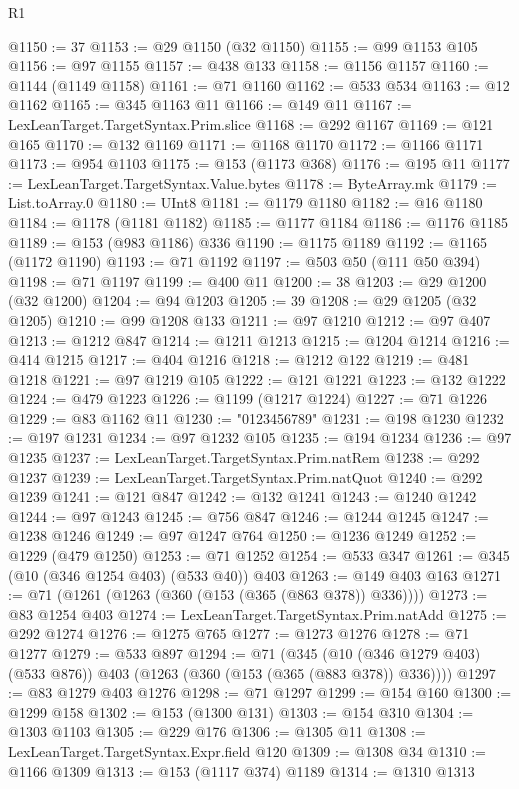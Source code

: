 \begin{lexlean}{R1}
\begin{coremodule}
{{{{{{{{{{{{{{{{{{{{{{{{{{{{{{{{{{{{{{{{{{{{{{{{{{{{{{{{{{{{{{{{{{{{{{{{{{{{{{{{{{{{{{{{{{{{{{{{{{{{{{{{{{{{{{{{{{{{{{{{{{{{{{{{{{{{{{{{{{{{{{{{{{{{{{{{{{{{{{{{{{{{{{{{{{{{{{{{{{{{{{{{{{@1150 := 37
@1153 := @29 @1150 (@32 @1150)
@1155 := @99 @1153 @105
@1156 := @97 @1155
@1157 := @438 @133
@1158 := @1156 @1157
@1160 := @1144 (@1149 @1158)
@1161 := @71 @1160
@1162 := @533 @534
@1163 := @12 @1162
@1165 := @345 @1163 @11
@1166 := @149 @11
@1167 := LexLeanTarget.TargetSyntax.Prim.slice
@1168 := @292 @1167
@1169 := @121 @165
@1170 := @132 @1169
@1171 := @1168 @1170
@1172 := @1166 @1171
@1173 := @954 @1103
@1175 := @153 (@1173 @368)
@1176 := @195 @11
@1177 := LexLeanTarget.TargetSyntax.Value.bytes
@1178 := ByteArray.mk
@1179 := List.toArray.{0}
@1180 := UInt8
@1181 := @1179 @1180
@1182 := @16 @1180
@1184 := @1178 (@1181 @1182)
@1185 := @1177 @1184
@1186 := @1176 @1185
@1189 := @153 (@983 @1186) @336
@1190 := @1175 @1189
@1192 := @1165 (@1172 @1190)
@1193 := @71 @1192
@1197 := @503 @50 (@111 @50 @394)
@1198 := @71 @1197
@1199 := @400 @11
@1200 := 38
@1203 := @29 @1200 (@32 @1200)
@1204 := @94 @1203
@1205 := 39
@1208 := @29 @1205 (@32 @1205)
@1210 := @99 @1208 @133
@1211 := @97 @1210
@1212 := @97 @407
@1213 := @1212 @847
@1214 := @1211 @1213
@1215 := @1204 @1214
@1216 := @414 @1215
@1217 := @404 @1216
@1218 := @1212 @122
@1219 := @481 @1218
@1221 := @97 @1219 @105
@1222 := @121 @1221
@1223 := @132 @1222
@1224 := @479 @1223
@1226 := @1199 (@1217 @1224)
@1227 := @71 @1226
@1229 := @83 @1162 @11
@1230 := "0123456789"
@1231 := @198 @1230
@1232 := @197 @1231
@1234 := @97 @1232 @105
@1235 := @194 @1234
@1236 := @97 @1235
@1237 := LexLeanTarget.TargetSyntax.Prim.natRem
@1238 := @292 @1237
@1239 := LexLeanTarget.TargetSyntax.Prim.natQuot
@1240 := @292 @1239
@1241 := @121 @847
@1242 := @132 @1241
@1243 := @1240 @1242
@1244 := @97 @1243
@1245 := @756 @847
@1246 := @1244 @1245
@1247 := @1238 @1246
@1249 := @97 @1247 @764
@1250 := @1236 @1249
@1252 := @1229 (@479 @1250)
@1253 := @71 @1252
@1254 := @533 @347
@1261 := @345 (@10 (@346 @1254 @403) (@533 @40)) @403
@1263 := @149 @403 @163
@1271 := @71 (@1261 (@1263 (@360 (@153 (@365 (@863 @378)) @336))))
@1273 := @83 @1254 @403
@1274 := LexLeanTarget.TargetSyntax.Prim.natAdd
@1275 := @292 @1274
@1276 := @1275 @765
@1277 := @1273 @1276
@1278 := @71 @1277
@1279 := @533 @897
@1294 := @71
    (@345 (@10 (@346 @1279 @403) (@533 @876)) @403 (@1263 (@360 (@153 (@365 (@883 @378)) @336))))
@1297 := @83 @1279 @403 @1276
@1298 := @71 @1297
@1299 := @154 @160
@1300 := @1299 @158
@1302 := @153 (@1300 @131)
@1303 := @154 @310
@1304 := @1303 @1103
@1305 := @229 @176
@1306 := @1305 @11
@1308 := LexLeanTarget.TargetSyntax.Expr.field @120
@1309 := @1308 @34
@1310 := @1166 @1309
@1313 := @153 (@1117 @374) @1189
@1314 := @1310 @1313
}}}}}}}}}}}}}}}}}}}}}}}}}}}}}}}}}}}}}}}}}}}}}}}}}}}}}}}}}}}}}}}}}}}}}}}}}}}}}}}}}}}}}}}}}}}}}}}}}}}}}}}}}}}}}}}}}}}}}}}}}}}}}}}}}}}}}}}}}}}}}}}}}}}}}}}}}}}}}}}}}}}}}}}}}}}}}}}}}}}}}}}}}}
\end{coremodule}
\end{lexlean}
